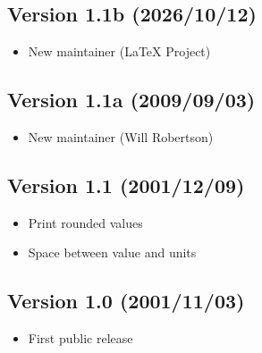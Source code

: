 \documentclass[12pt]{article}
\begin{document}
\subsection*{Version 1.1b (2026/10/12)}

\begin{itemize}
\item New maintainer (\LaTeX{} Project)
\end{itemize}


\subsection*{Version 1.1a (2009/09/03)}

\begin{itemize}
\item New maintainer (Will Robertson)
\end{itemize}


\subsection*{Version 1.1 (2001/12/09)}

\begin{itemize}
\item Print rounded values
\item Space between value and units
\end{itemize}


\subsection*{Version 1.0 (2001/11/03)}

\begin{itemize}
\item First public release
\end{itemize}
\end{document}
